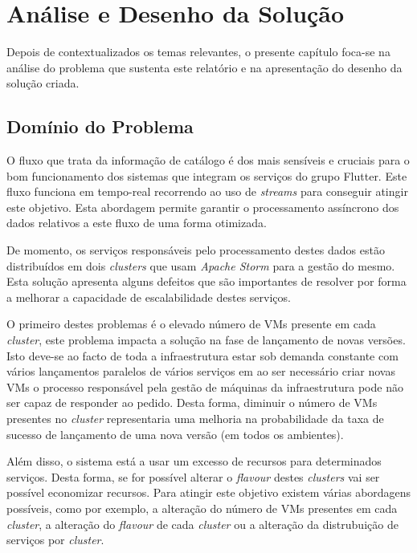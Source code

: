 \chapter{Análise e Desenho da Solução}
\label{sec:3-Analise}

Depois de contextualizados os temas relevantes, o presente capítulo foca-se na análise do problema 
que sustenta este relatório e na apresentação do desenho da solução criada.

\section{Domínio do Problema}

O fluxo que trata da informação de catálogo é dos mais sensíveis e cruciais para o bom funcionamento
dos sistemas que integram os serviços do grupo Flutter. Este fluxo funciona em tempo-real recorrendo
ao uso de \textit{streams} para conseguir atingir este objetivo. Esta abordagem permite garantir
o processamento assíncrono dos dados relativos a este fluxo de uma forma otimizada.

De momento, os serviços responsáveis pelo processamento destes dados estão distribuídos em dois
\textit{\glspl{cluster}} que usam \textit{Apache Storm} para a gestão do mesmo. Esta solução apresenta alguns
defeitos que são importantes de resolver por forma a melhorar a capacidade de escalabilidade destes
serviços. 

O primeiro destes problemas é o elevado número de \acp{VM} presente em cada \textit{\gls{cluster}},
este problema impacta a solução na fase de lançamento de novas versões. Isto deve-se ao facto de
toda a infraestrutura estar sob demanda constante com vários lançamentos paralelos de vários serviços
em ao ser necessário criar novas \acp{VM} o processo responsável pela gestão de máquinas da
infraestrutura pode não ser capaz de responder ao pedido. Desta forma, diminuir o número de \acp{VM}
presentes no \textit{\gls{cluster}} representaria uma melhoria na probabilidade da taxa de sucesso de
lançamento de uma nova versão (em todos os ambientes).

Além disso, o sistema está a usar um excesso de recursos para determinados serviços. Desta forma,
se for possível alterar o \textit{\gls{flavour}} destes \textit{\glspl{cluster}} vai ser possível economizar
recursos. Para atingir este objetivo existem várias abordagens possíveis, como por exemplo, a
alteração do número de \acp{VM} presentes em cada \textit{\gls{cluster}}, a alteração do \textit{\gls{flavour}}
de cada \textit{\gls{cluster}} ou a alteração da distrubuição de serviços por \textit{\gls{cluster}}.

